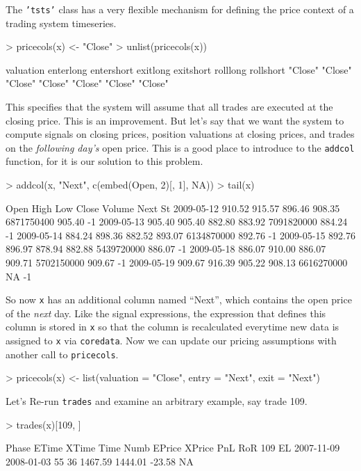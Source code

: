 \documentclass[a4]{article}
\newcommand{\code}[1]{\texttt{#1}}
\begin{document}
The \code{'tsts'} class has a very flexible mechanism for defining the
price context of a trading system timeseries. 
\begin{Schunk}
\begin{Sinput}
> pricecols(x) <- "Close"
> unlist(pricecols(x))
\end{Sinput}
\begin{Soutput}
 valuation  enterlong entershort   exitlong  exitshort   rolllong  rollshort 
   "Close"    "Close"    "Close"    "Close"    "Close"    "Close"    "Close" 
\end{Soutput}
\end{Schunk}
This specifies that the system will assume that all trades are
executed at the closing price. This is an improvement. But let's say
that we want the system to compute signals on closing prices, position
valuations at closing prices, and trades on the \emph{following day's}
open price. This is a good place to introduce to the \code{addcol}
function, for it is our solution to this problem.
\begin{Schunk}
\begin{Sinput}
> addcol(x, "Next", c(embed(Open, 2)[, 1], NA))
> tail(x)
\end{Sinput}
\begin{Soutput}
             Open   High    Low  Close     Volume   Next St
2009-05-12 910.52 915.57 896.46 908.35 6871750400 905.40 -1
2009-05-13 905.40 905.40 882.80 883.92 7091820000 884.24 -1
2009-05-14 884.24 898.36 882.52 893.07 6134870000 892.76 -1
2009-05-15 892.76 896.97 878.94 882.88 5439720000 886.07 -1
2009-05-18 886.07 910.00 886.07 909.71 5702150000 909.67 -1
2009-05-19 909.67 916.39 905.22 908.13 6616270000     NA -1
\end{Soutput}
\end{Schunk}
So now \code{x} has an additional column named ``Next'', which
contains the open price of the \emph{next} day. Like the signal
expressions, the expression that defines this column is stored in
\code{x} so that the column is recalculated everytime new data is
assigned to \code{x} via \code{coredata}. Now we can update our
pricing assumptions with another call to \code{pricecols}.
\begin{Schunk}
\begin{Sinput}
> pricecols(x) <- list(valuation = "Close", entry = "Next", exit = "Next")
\end{Sinput}
\end{Schunk}
Let's Re-run \code{trades} and examine an arbitrary example, say trade 109.
\begin{Schunk}
\begin{Sinput}
> trades(x)[109, ]
\end{Sinput}
\begin{Soutput}
    Phase      ETime      XTime Time Numb  EPrice  XPrice    PnL RoR
109    EL 2007-11-09 2008-01-03   55   36 1467.59 1444.01 -23.58  NA
\end{Soutput}
\end{Schunk}
\end{document}
